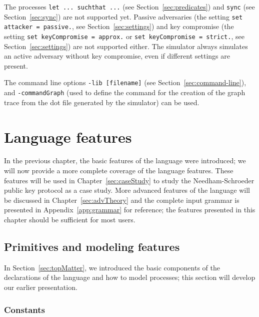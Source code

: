 \documentclass{book}
\begin{document}
The processes \lstinline!let ... suchthat ...! (see Section~\ref{sec:predicates}) and  \lstinline!sync! (see Section~\ref{sec:sync}) are not supported yet. Passive adversaries (the setting \lstinline{set attacker = passive.}, see Section~\ref{sec:settings}) and key compromise (the setting \lstinline{set keyCompromise = approx.} or \lstinline{set keyCompromise = strict.}, see Section~\ref{sec:settings}) are not supported either. The simulator always simulates an active adversary without key compromise, even if different settings are present.

The command line options \texttt{-lib [filename]} (see Section~\ref{sec:command-line}), and \texttt{-commandGraph} (used to define the command for the creation of the graph trace from the dot file generated by the simulator) can be used.



\chapter{Language features}\label{sec:advLang}

In the previous chapter, the basic features of the language were introduced; we will now provide a more complete coverage of the language features. These features will be used in Chapter~\ref{sec:caseStudy} to study the Needham-Schroeder public key protocol as a case study. More advanced features of the language will be discussed in Chapter~\ref{sec:advTheory} and the complete input grammar is presented in Appendix~\ref{app:grammar} for reference; the features presented in this chapter should be sufficient for most users.

\section{Primitives and modeling features}

In Section~\ref{sec:topMatter}, we introduced the basic components of the declarations of the language and how to model processes; this section will develop our earlier presentation.

\subsection{Constants}\label{sec:constants}
\end{document}
